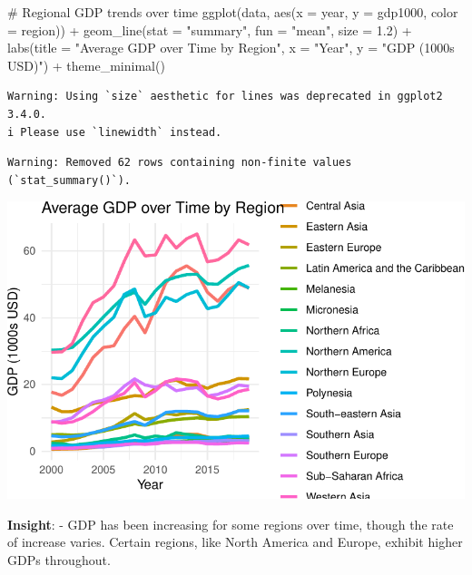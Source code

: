 \documentclass[
  letterpaper,
  DIV=11,
  numbers=noendperiod]{scrartcl}
\newenvironment{Shaded}{\begin{snugshade}}{\end{snugshade}}
\newcommand{\AttributeTok}[1]{\textcolor[rgb]{0.40,0.45,0.13}{#1}}
\newcommand{\CommentTok}[1]{\textcolor[rgb]{0.37,0.37,0.37}{#1}}
\newcommand{\FloatTok}[1]{\textcolor[rgb]{0.68,0.00,0.00}{#1}}
\newcommand{\FunctionTok}[1]{\textcolor[rgb]{0.28,0.35,0.67}{#1}}
\newcommand{\NormalTok}[1]{\textcolor[rgb]{0.00,0.23,0.31}{#1}}
\newcommand{\SpecialCharTok}[1]{\textcolor[rgb]{0.37,0.37,0.37}{#1}}
\newcommand{\StringTok}[1]{\textcolor[rgb]{0.13,0.47,0.30}{#1}}
\begin{document}
\begin{Shaded}
\begin{Highlighting}[]
\CommentTok{\# Regional GDP trends over time}
\FunctionTok{ggplot}\NormalTok{(data, }\FunctionTok{aes}\NormalTok{(}\AttributeTok{x =}\NormalTok{ year, }\AttributeTok{y =}\NormalTok{ gdp1000, }\AttributeTok{color =}\NormalTok{ region)) }\SpecialCharTok{+}
  \FunctionTok{geom\_line}\NormalTok{(}\AttributeTok{stat =} \StringTok{"summary"}\NormalTok{, }\AttributeTok{fun =} \StringTok{"mean"}\NormalTok{, }\AttributeTok{size =} \FloatTok{1.2}\NormalTok{) }\SpecialCharTok{+}
  \FunctionTok{labs}\NormalTok{(}\AttributeTok{title =} \StringTok{"Average GDP over Time by Region"}\NormalTok{, }\AttributeTok{x =} \StringTok{"Year"}\NormalTok{, }\AttributeTok{y =} \StringTok{"GDP (1000s USD)"}\NormalTok{) }\SpecialCharTok{+}
  \FunctionTok{theme\_minimal}\NormalTok{()}
\end{Highlighting}
\end{Shaded}

\begin{verbatim}
Warning: Using `size` aesthetic for lines was deprecated in ggplot2 3.4.0.
i Please use `linewidth` instead.
\end{verbatim}

\begin{verbatim}
Warning: Removed 62 rows containing non-finite values (`stat_summary()`).
\end{verbatim}

\includegraphics{EDA_files/figure-pdf/unnamed-chunk-8-1.pdf}

\textbf{Insight}: - GDP has been increasing for some regions over time,
though the rate of increase varies. Certain regions, like North America
and Europe, exhibit higher GDPs throughout.
\end{document}
